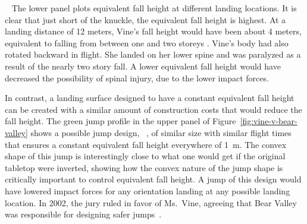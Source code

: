 \documentclass{article}
\begin{document}
~
The lower panel plots equivalent fall height at different landing
locations. It is clear that just short of the knuckle, the
equivalent fall height is highest. At a landing distance of 12 meters, Vine's fall height would have been
about 4 meters, equivalent to falling from between one and two storeys \cite{Vish2005}.
Vine's body had also
rotated backward in flight. She landed on her lower spine and was paralyzed as a result
of the nearly two story fall. A lower equivalent fall height would have decreased the
possibility of spinal injury, due to the lower impact forces.


In contrast, a landing surface designed to have a
constant equivalent fall height can be created with a similar amount of
construction costs that would reduce the fall height.
The green jump profile in the upper panel of
Figure~\ref{fig:vine-v-bear-valley} shows a possible jump design, 
~\cite{Levy2015}, of similar size with similar 
flight times that ensures a constant equivalent fall height everywhere of 1~\si{\meter}.
The convex shape of this jump is interestingly close to what one would get if
the original tabletop were inverted, showing how the convex nature of the jump
shape is critically important to control equivalent fall height. A jump of this
design would have lowered impact forces for any orientation landing at any
possible landing location. In 2002, the jury ruled in favor of Ms.~Vine,
agreeing that Bear Valley was responsible for designing safer
jumps~\cite{Alvarado2002}.
\end{document}
